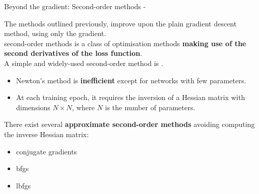 
\begin{frame}[t,allowframebreaks]{
    Beyond the gradient: Second-order methods -}

    The methods outlined previously, improve upon the plain
    \gls{gradient descent} method,
    using only the \gls{gradient}.\\
    \vspace{0.2cm}
    \Glspl{second-order method}
    is a class of \gls{optimisation} methods
    {\bf making use of the second derivatives of the 
    \gls{loss function}}.\\
    \vspace{0.2cm}
    A simple and widely-used \gls{second-order method} is
    .\\
    \begin{itemize}
        \small
        \item \gls{Newton's method} is {\bf inefficient} except 
        for networks with few parameters.\\ 
        \item At each training \gls{epoch}, 
        it requires the inversion of a
        \gls{Hessian} matrix with
        dimensions $N \times N$, where $N$ is the 
        number of parameters. 
    \end{itemize}
    \vspace{0.2cm}
    There exist several {\bf approximate \glspl{second-order method}} 
    avoiding computing the inverse \gls{Hessian} matrix:
    \begin{itemize}
        \item {}\Gls{conjugate gradients}
        \item {}\gls{bfgs} 
        \item {}\gls{lbfgs} 
    \end{itemize}

\end{frame}
